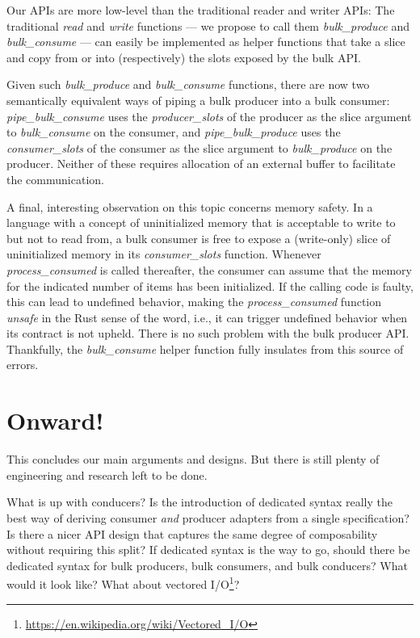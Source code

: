 \documentclass[sigplan,screen,10pt,review]{acmart}
\begin{document}
Our APIs are more low-level than the traditional reader and writer APIs: The traditional \textit{read} and \textit{write} functions --- we propose to call them \textit{bulk\_produce} and \textit{bulk\_consume} --- can easily be implemented as helper functions that take a slice and copy from or into (respectively) the slots exposed by the bulk API.

Given such \textit{bulk\_produce} and \textit{bulk\_consume} functions, there are now two semantically equivalent ways of piping a bulk producer into a bulk consumer: \textit{pipe\_bulk\_consume} uses the \textit{producer\_slots} of the producer as the slice argument to \textit{bulk\_consume} on the consumer, and \textit{pipe\_bulk\_produce} uses the \textit{consumer\_slots} of the consumer as the slice argument to \textit{bulk\_produce} on the producer. Neither of these requires allocation of an external buffer to facilitate the communication.

A final, interesting observation on this topic concerns memory safety. In a language with a concept of uninitialized memory that is acceptable to write to but not to read from, a bulk consumer is free to expose a (write-only) slice of uninitialized memory in its \textit{consumer\_slots} function. Whenever \textit{process\_consumed} is called thereafter, the consumer can assume that the memory for the indicated number of items has been initialized. If the calling code is faulty, this can lead to undefined behavior, making the \textit{process\_consumed} function \textit{unsafe} in the Rust sense of the word, i.e., it can trigger undefined behavior when its contract is not upheld. There is no such problem with the bulk producer API. Thankfully, the \textit{bulk\_consume} helper function fully insulates from this source of errors.

\section{Onward!}\label{fun}

This concludes our main arguments and designs. But there is still plenty of engineering and research left to be done.

What is up with conducers? Is the introduction of dedicated syntax really the best way of deriving consumer \textit{and} producer adapters from a single specification? Is there a nicer API design that captures the same degree of composability without requiring this split? If dedicated syntax is the way to go, should there be dedicated syntax for bulk producers, bulk consumers, and bulk conducers? What would it look like? What about vectored I/O\footnote{\url{https://en.wikipedia.org/wiki/Vectored_I/O}}?
\end{document}
